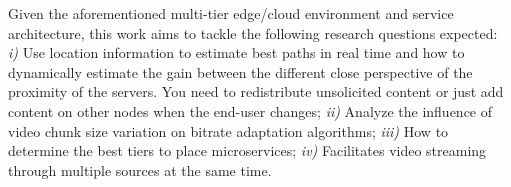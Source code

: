 Given the aforementioned multi-tier edge/cloud environment and service architecture, this work aims to tackle the following research questions expected:
\textit{i)} Use location information to estimate best paths in real time and how to dynamically estimate the gain between the different close perspective of the proximity of the servers. You need to redistribute unsolicited content or just add content on other nodes when the end-user changes; \textit{ii)} Analyze the influence of video chunk size variation on bitrate adaptation algorithms; \textit{iii)} How to determine the best tiers to place microservices; \textit{iv)} Facilitates video streaming through multiple sources at the same time.



%

